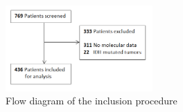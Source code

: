 \begin{figure}
    \centering
    \includegraphics[width=0.5\textwidth,height=0.5\textwidth]{Figures/Inclusion_flow_chart.png}

    \caption{Flow diagram of the inclusion procedure}\label{fig:HGG_location_flowchart}
\end{figure}

